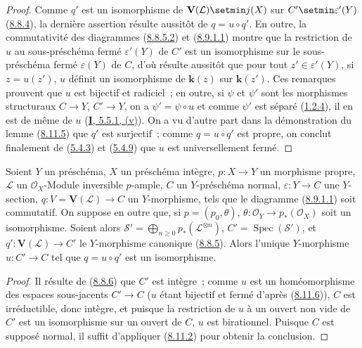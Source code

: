 \begin{proof}
Comme $q'$ est un isomorphisme de $\mathbf{V}(\mathcal{L})\setmin j(X)$ sur
$C'\setmin\varepsilon'(Y)$ (\hyperref[II.8.8.4-fr]{8.8.4}), la dernière assertion
résulte aussitôt de $q=u\circ q'$. En outre, la commutativité des diagrammes
(\hyperref[II.8.8.5.2-fr]{8.8.5.2}) et
(\hyperref[II.8.9.1.1-fr]{8.9.1.1}) montre que la restriction de $u$ au
sous-préschéma fermé $\varepsilon'(Y)$ de $C'$ est un isomorphisme sur le
sous-préschéma fermé $\varepsilon(Y)$ de $C$, d'où résulte aussitôt que pour
tout $z'\in\varepsilon'(Y)$, si $z=u(z')$, $u$ définit un isomorphisme de
$\boldsymbol{k}(z)$ sur $\boldsymbol{k}(z')$. Ces remarques prouvent que $u$ est bijectif et radiciel~;
en outre, si $\psi$ et $\psi'$ sont les morphismes structuraux $C\to Y$,
$C'\to Y$, on a $\psi'=\psi\circ u$ et comme $\psi'$ est séparé
(\hyperref[II.1.2.4-fr]{1.2.4}), il en est de même de $u$
(\hyperref[I.5.5.1-fr]{\textbf{I}, 5.5.1, (v)}). On a vu d'autre part dans la
démonstration du lemme (\hyperref[II.8.11.5-fr]{8.11.5}) que $q'$ est
surjectif~; comme $q=u\circ q'$ est propre, on conclut finalement de
(\hyperref[II.5.4.3-fr]{5.4.3}) et (\hyperref[II.5.4.9-fr]{5.4.9}) que $u$
est universellement fermé.
\end{proof}

\begin{proposition}[8.11.7]
\label{II.8.11.7-fr}
Soient $Y$ un préschéma, $X$ un préschéma \textup{intègre}, $p:X\to Y$ un morphisme
propre, $\mathcal{L}$ un $\mathcal{O}_X$-Module inversible $p$-ample, $C$ un
$Y$-préschéma \textup{normal}, $\varepsilon:Y\to C$ une $Y$-section,
$q:V=\mathbf{V}(\mathcal{L})\to C$ un $Y$-morphisme, tels que le diagramme
\textup{(\hyperref[II.8.9.1.1-fr]{8.9.1.1})} soit commutatif. On suppose en outre que,
si $p=(p_0,\theta)$, $\theta:\mathcal{O}_Y\to p_*(\mathcal{O}_X)$ soit un
isomorphisme. Soient alors
$\mathcal{S}'=\bigoplus_{n\geqslant0}p_*(\mathcal{L}^{\otimes n})$,
$C'=\operatorname{Spec}(\mathcal{S}')$, \textup{et}
$q':\mathbf{V}(\mathcal{L})\to C'$ le $Y$-morphisme canonique
\textup{(\hyperref[II.8.8.5-fr]{8.8.5})}. Alors l'unique $Y$-morphisme $u:C'\to C$ tel
que $q=u\circ q'$ est un \textup{isomorphisme}.
\end{proposition}

\begin{proof}
Il résulte de (\hyperref[II.8.8.6-fr]{8.8.6}) que $C'$ est intègre~; comme
$u$ est un homéomorphisme des espaces sous-jacents $C'\to C$ ($u$ étant
bijectif et fermé d'après (\hyperref[II.8.11.6-fr]{8.11.6})), $C$ est
irréductible, donc intègre, et puisque la restriction de $u$ à un ouvert non
vide de $C'$ est un isomorphisme sur un ouvert de $C$, $u$ est birationnel.
Puisque $C$ est supposé normal, il suffit d'appliquer
(\hyperref[II.8.11.2-fr]{8.11.2}) pour obtenir la conclusion.
\end{proof}

